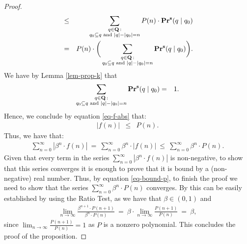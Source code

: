 \begin{proof}
\begin{eqnarray}
\notag
& \leq & \sum_{\substack{q \in \mathbf{Q} \,: \\ q_0 \subseteq q \text{ {\rm and} } |q| - |q_0| = n}} P(n) \cdot \mathbf{Pr}^{\mathbf{s}}(q \mid q_0)\\
\label{eq-f-abs}
& = & P(n) \cdot \bigg(\sum_{\substack{q \in \mathbf{Q} \,: \\ q_0 \subseteq q \text{ {\rm and} } |q| - |q_0| = n}} \mathbf{Pr}^{\mathbf{s}}(q \mid q_0)\bigg).
\end{eqnarray}
We have by Lemma \ref{lem-prop-k} that
\begin{eqnarray*}
\sum_{\substack{q \in \mathbf{Q} \,: \\ q_0 \subseteq q \text{ {\rm and} } |q| - |q_0| = n}} \mathbf{Pr}^{\mathbf{s}}(q \mid q_0) & = & 1.
\end{eqnarray*}
Hence, we conclude by equation \eqref{eq-f-abs} that:
\begin{eqnarray*}
|f(n)| & \leq & P(n).
\end{eqnarray*}
Thus, we have that:
\begin{eqnarray}\label{eq-bound-p}
\sum_{n=0}^\infty |\beta^n \cdot f(n)| \ = \ \sum_{n=0}^\infty \beta^n \cdot |f(n)|
\ \leq \ \sum_{n=0}^\infty \beta^n \cdot P(n).
\end{eqnarray}
Given that every term in the series $\sum_{n=0}^\infty |\beta^n \cdot f(n)|$ is non-negative, to show that this series converges it is enough to prove that it is bound by a (non-negative) real number. Thus, by equation \eqref{eq-bound-p}, to finish the proof we need to show that the series $\sum_{n=0}^\infty \beta^n \cdot P(n)$ converges. By this can be easily established by using the Ratio Test, as we have that $\beta \in (0,1)$ and
\begin{eqnarray*}
\lim_{n \to \infty} \frac{\beta^{n+1} \cdot P(n+1)}{\beta^{n} \cdot P(n)} \ = \ \beta \cdot \lim_{n \to \infty} \frac{P(n+1)}{P(n)}
\ = \ \beta,
\end{eqnarray*}
since $\lim_{n \to \infty} \frac{P(n+1)}{P(n)} = 1$ as $P$ is a nonzero polynomial.
This concludes the proof of the proposition.
\end{proof}
